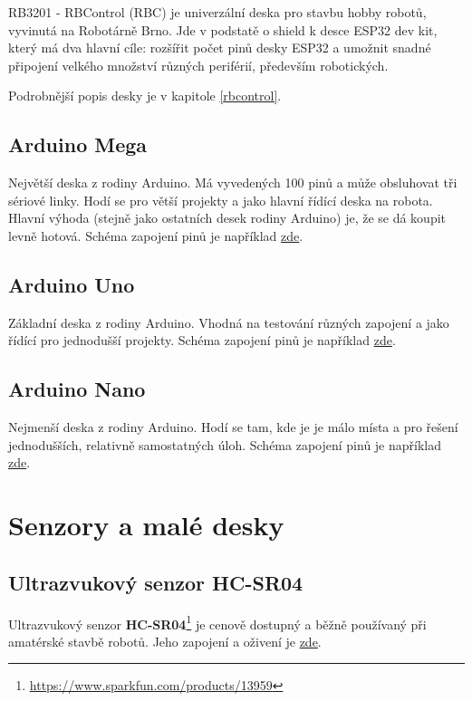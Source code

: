 RB3201 - RBControl (RBC) je univerzální deska pro stavbu hobby robotů, vyvinutá na Robotárně Brno. 
Jde v podstatě o shield k desce ESP32 dev kit, který má dva hlavní cíle: 
rozšířit počet pinů desky ESP32 a umožnit snadné připojení velkého množství různých periférií, především robotických. 

Podrobnější popis desky je v kapitole \ref{rbcontrol}.

\subsection{Arduino Mega}

Největší deska z rodiny Arduino. Má vyvedených 100 pinů a může obsluhovat tři sériové linky. 
Hodí se pro větší projekty a jako hlavní řídící deska na robota. 
Hlavní výhoda (stejně jako ostatních desek rodiny Arduino) je, že se dá koupit levně hotová.
Schéma zapojení pinů je například \href{https://arduino-info.wikispaces.com/MegaQuickRef}{zde}.

\subsection{Arduino Uno}

Základní deska z rodiny Arduino. Vhodná na testování různých zapojení a jako řídící pro jednodušší projekty.
Schéma zapojení pinů je například \href{http://forum.arduino.cc/index.php?topic=146315.0}{zde}.

\subsection{Arduino Nano}

Nejmenší deska z rodiny Arduino. 
Hodí se tam, kde je je málo místa a pro řešení jednodušších, relativně samostatných úloh. 
Schéma zapojení pinů je například \href{https://simba-os.readthedocs.io/en/latest/_images/arduino-nano-pinout.png}{zde}.

\section{Senzory a malé desky}

\label{hcsr04} \subsection{Ultrazvukový senzor HC-SR04} 

Ultrazvukový senzor {\bf HC-SR04}\footnote{\url{https://www.sparkfun.com/products/13959}}  je cenově dostupný a běžně používaný při amatérské stavbě robotů. 
Jeho zapojení a oživení je 
  \href{https://randomnerdtutorials.com/complete-guide-for-ultrasonic-sensor-hc-sr04/}{zde}.

